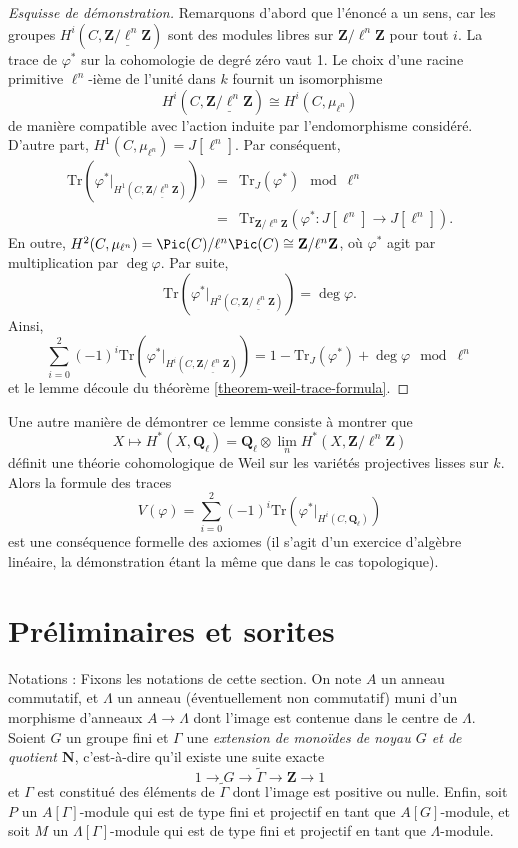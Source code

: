 \begin{proof}[Esquisse de démonstration]
Remarquons d'abord que l'énoncé a un sens, car les groupes $H^i(C,
\underline{\mathbf{Z}/\ell^n \mathbf{Z}})$ sont des modules libres sur $\mathbf{Z}/\ell^n
\mathbf{Z}$ pour tout $i$. La trace de $\varphi^*$ sur la
cohomologie de degré zéro vaut 1. Le choix d'une racine primitive $\ell^n$-ième de l'unité dans $k$
fournit un isomorphisme
$$
H^i(C, \underline{\mathbf{Z}/\ell^n \mathbf{Z}}) \cong H^i(C, \mu_{\ell^n})
$$
de manière compatible avec l'action induite par l'endomorphisme considéré. D'autre part,
$H^1(C, \mu_{\ell^n}) = J[\ell^n]$. Par conséquent,
\begin{eqnarray*}
\text{Tr}(\varphi^* |_{H^1 (C, \underline{\mathbf{Z}/\ell^n \mathbf{Z}})})) & =
& \text{Tr}_J (\varphi^*) \mod \ell^n \\
& = & \text{Tr}_{\mathbf{Z}/\ell^n \mathbf{Z}} (\varphi^* : J[\ell^n] \to
J[\ell^n]).
\end{eqnarray*}
En outre, $H^2(C, \mu_{\ell^n}) = \Pic(C)/\ell^n\Pic(C) \cong
\mathbf{Z}/\ell^n \mathbf{Z}$, où $\varphi^*$ agit par multiplication par $\deg
\varphi$. Par suite,
$$
\text{Tr} (\varphi^*|_{H^2 (C, \underline{\mathbf{Z}/\ell^n \mathbf{Z}})}) =
\deg \varphi.
$$
Ainsi,
$$
\sum_{i = 0}^2 (-1)^i
\text{Tr}(\varphi^* |_{H^i (C, \underline{\mathbf{Z}/\ell^n \mathbf{Z}})}) =
1 - \text{Tr}_J(\varphi^*) + \deg \varphi \mod \ell^n
$$
et le lemme découle du théorème \ref{theorem-weil-trace-formula}.
\end{proof}

\noindent
Une autre manière de démontrer ce lemme consiste à montrer que
$$
X \mapsto H^* (X, \mathbf{Q}_\ell) =
\mathbf{Q}_\ell \otimes
\lim_n H^*(X, \mathbf{Z}/\ell^n\mathbf{Z})
$$
définit une théorie cohomologique de Weil sur les variétés projectives lisses sur $k$. Alors
la formule des traces
$$
V(\varphi) = \sum_{i = 0}^2 (-1)^i
\text{Tr}(\varphi^* |_{H^i(C, \mathbf{Q}_\ell)})
$$
est une conséquence formelle des axiomes (il s'agit d'un exercice d'algèbre linéaire, la
démonstration étant la même que dans le cas topologique).




\section{Préliminaires et sorites}
\label{section-preliminaries}

\noindent
Notations :
Fixons les notations de cette section. On note $A$ un anneau commutatif,
et $\Lambda$ un anneau (éventuellement non commutatif) muni d'un morphisme d'anneaux $A\to \Lambda$ dont
l'image est contenue dans le centre de $\Lambda$. Soient $G$ un groupe fini et $\Gamma$ une
{\it extension de monoïdes de noyau $G$ et de quotient $\mathbf{N}$}, c'est-à-dire qu'il existe une
suite exacte
$$
1\to G\to \tilde\Gamma\to \mathbf{Z}\to 1
$$
et $\Gamma$ est constitué des éléments de $\tilde\Gamma$ dont l'image est
positive ou nulle. Enfin, soit $P$ un $A[\Gamma]$-module qui est de type fini et
projectif en tant que $A[G]$-module, et soit $M$ un $\Lambda[\Gamma]$-module qui est
de type fini et projectif en tant que $\Lambda$-module.

